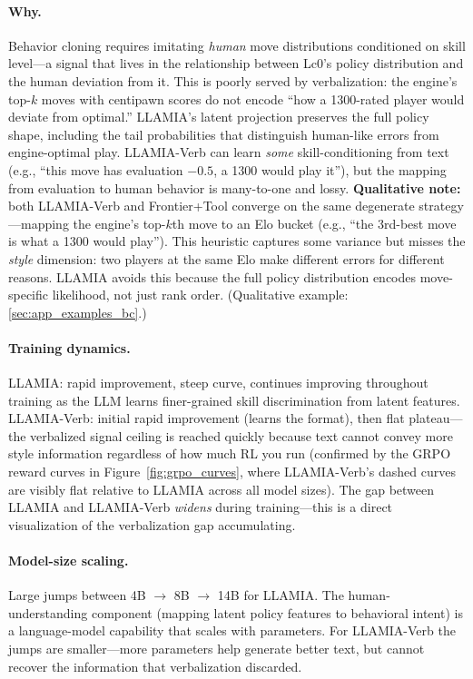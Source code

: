 \paragraph{Why.}
Behavior cloning requires imitating \emph{human} move distributions
conditioned on skill level---a signal that lives in the relationship
between Lc0's policy distribution and the human deviation from it.
This is poorly served by verbalization: the engine's top-$k$ moves
with centipawn scores do not encode ``how a 1300-rated player would
deviate from optimal.'' LLAMIA's latent projection preserves the
full policy shape, including the tail probabilities that distinguish
human-like errors from engine-optimal play. LLAMIA-Verb can learn
\emph{some} skill-conditioning from text (e.g., ``this move has
evaluation $-0.5$, a 1300 would play it''), but the mapping from
evaluation to human behavior is many-to-one and lossy.
\textbf{Qualitative note:} both LLAMIA-Verb and Frontier+Tool
converge on the same degenerate strategy---mapping the engine's
top-$k$th move to an Elo bucket (e.g., ``the 3rd-best move is what
a 1300 would play''). This heuristic captures some variance but
misses the \emph{style} dimension: two players at the same Elo make
different errors for different reasons. LLAMIA avoids this because
the full policy distribution encodes move-specific likelihood, not
just rank order. (Qualitative example: \cref{sec:app_examples_bc}.)

\paragraph{Training dynamics.}
LLAMIA: rapid improvement, steep curve, continues improving
throughout training as the LLM learns finer-grained skill
discrimination from latent features. LLAMIA-Verb: initial rapid
improvement (learns the format), then flat plateau---the verbalized
signal ceiling is reached quickly because text cannot convey more
style information regardless of how much RL you run (confirmed by
the GRPO reward curves in Figure~\ref{fig:grpo_curves}, where
LLAMIA-Verb's dashed curves are visibly flat relative to LLAMIA
across all model sizes). The gap between LLAMIA and LLAMIA-Verb
\emph{widens} during training---this is a direct visualization
of the verbalization gap accumulating.

\paragraph{Model-size scaling.}
Large jumps between 4B $\to$ 8B $\to$ 14B for LLAMIA. The
human-understanding component (mapping latent policy features to
behavioral intent) is a language-model capability that scales with
parameters. For LLAMIA-Verb the jumps are smaller---more parameters
help generate better text, but cannot recover the information that
verbalization discarded.

